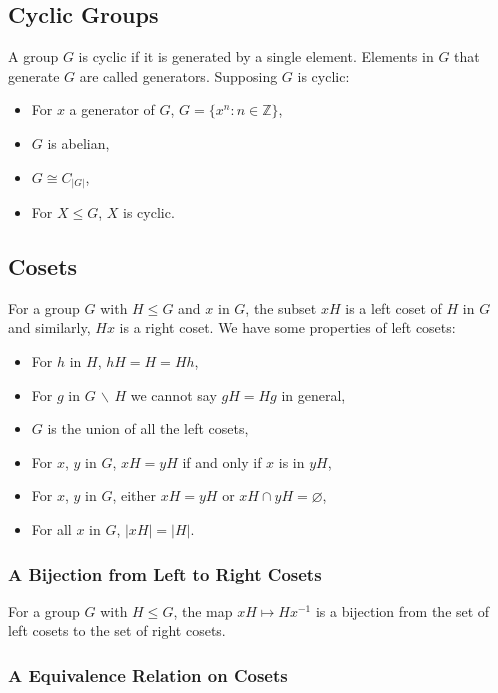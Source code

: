 \subsection{Cyclic Groups}

A group $G$ is cyclic if it is generated by a single element. Elements in
$G$ that generate $G$ are called generators. Supposing $G$ is cyclic: \begin{itemize}
    \item For $x$ a generator of $G$, $G = \{x^n : n \in \mathbb{Z}\}$,
    \item $G$ is abelian,
    \item $G \cong C_{|G|}$,
    \item For $X \leq G$, $X$ is cyclic.
\end{itemize}

\subsection{Cosets}

For a group $G$ with $H \leq G$ and $x$ in $G$, the subset $xH$ is a left
coset of $H$ in $G$ and similarly, $Hx$ is a right coset. We have
some properties of left cosets: \begin{itemize}
    \item For $h$ in $H$, $hH = H = Hh$,
    \item For $g$ in $G \, \backslash \, H$ we cannot say $gH = Hg$ in general,
    \item $G$ is the union of all the left cosets,
    \item For $x$, $y$ in $G$, $xH = yH$ if and only if $x$ is in $yH$,
    \item For $x$, $y$ in $G$, either $xH = yH$ or $xH \cap yH = \varnothing$,
    \item For all $x$ in $G$, $|xH| = |H|$.
\end{itemize}

\subsubsection{A Bijection from Left to Right Cosets}

For a group $G$ with $H \leq G$, the map $xH \mapsto Hx^{-1}$ is a 
bijection from the set of left cosets to the set of right cosets.

\subsubsection{A Equivalence Relation on Cosets}


